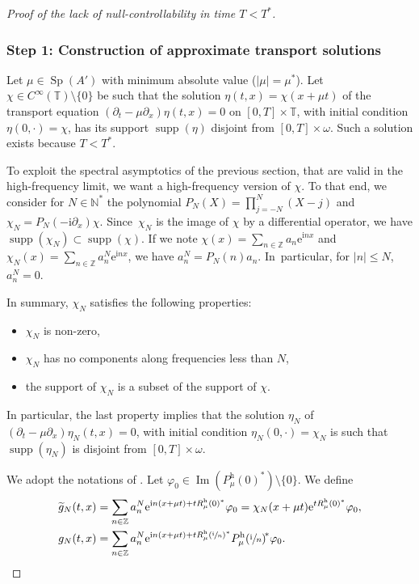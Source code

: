 \documentclass[10pt]{amsart}
\theoremstyle{plain}
\theoremstyle{definition}
\theoremstyle{remark}
\DeclareMathOperator{\Sp}{Sp}
\DeclareMathOperator{\Ima}{Im}
\DeclareMathOperator{\Supp}{supp}
\newcommand{\set}{\mathbb}
\newcommand{\h}{{\mathrm h}}
\newcommand{\eu}{\mathrm e}
\newcommand{\iu}{\mathrm i}
\let\originalleft\left
\let\originalright\right
\renewcommand{\left}{\mathopen{}\mathclose\bgroup\originalleft}
\renewcommand{\right}{\aftergroup\egroup\originalright}
\newcommand{\iun}{\left(\sfrac{\iu}{n}\right)}
\begin{document}
\skpt
\begin{proof}[Proof of the lack of null-controllability in time $T<T^*$]

\subsubsection*{Step 1: Construction of approximate transport solutions} Let $\mu \in \Sp(A')$ with minimum absolute value (\ie $|\mu| = \mu^*$). Let $\chi\in C^\infty(\set T)\setminus\{0\}$ be such that the solution $\eta(t,x)=\chi(x+\mu t)$ of the transport equation $(\partial_t-\mu\partial_x)\eta(t,x) = 0$ on $[0,T]\times\set T$, with initial condition $\eta(0,\cdot) = \chi$, has its support $\Supp(\eta)$ disjoint from $[0,T]\times \omega$. Such a solution exists because $T<T^*$.

To exploit the spectral asymptotics of the previous section, that are valid in the high-frequency limit, we want a high-frequency version of $\chi$. To that end, we consider for $N\in\set N^*$ the polynomial $P_N(X) = \prod_{j=-N}^N(X-j)$ and $\chi_N = P_N(-\iu \partial_x)\chi$. Since~$\chi_N$ is the image of $\chi$ by a differential operator, we have $\Supp(\chi_N)\subset \Supp(\chi)$. If we note $\chi(x) = \sum_{n\in\set Z} a_n \eu^{\iu nx}$ and $\chi_N(x) = \sum_{n\in\set Z} a_n^N \eu^{\iu nx}$, we have $a_n^N = P_N(n) a_n$. In~particular, for $|n|\leq N$, $a_n^N = 0$.

In summary, $\chi_N$ satisfies the following properties:
\begin{itemize}
\item $\chi_N$ is non-zero,
\item $\chi_N$ has no components along frequencies less than $N$,
\item the support of $\chi_N$ is a subset of the support of $\chi$.
\end{itemize}
In particular, the last property implies that the solution $\eta_N$ of $(\partial_t-\mu\partial_x)\eta_N(t,x) = 0$, with initial condition $\eta_N(0,\cdot) = \chi_N$ is such that $\Supp(\eta_N)$ is disjoint from $[0,T]\times \omega$.

We adopt the notations of . Let $\varphi_0\in\Ima(P_\mu^\h(0)^*)\setminus\{0\}$. We define
\begin{align}
\widetilde g_N(t,x)
&= \sum_{n\in\set Z} a_n^N \eu^{\iu n(x+\mu t)+tR_\mu^\h(0)^*}\varphi_0
= \chi_N(x+\mu t)\eu^{tR_\mu^\h(0)^*}\varphi_0\label{eq:def_gN_approx},\\
g_N(t,x)
&=\sum_{n\in\set Z} a_n^N
\eu^{\iu n(x+\mu t) +tR_\mu^\h\iun^*}P_\mu^\h\iun^{\!*}\varphi_0. \label{eq:def_gN}
\end{align}


\end{proof}
\end{document}
